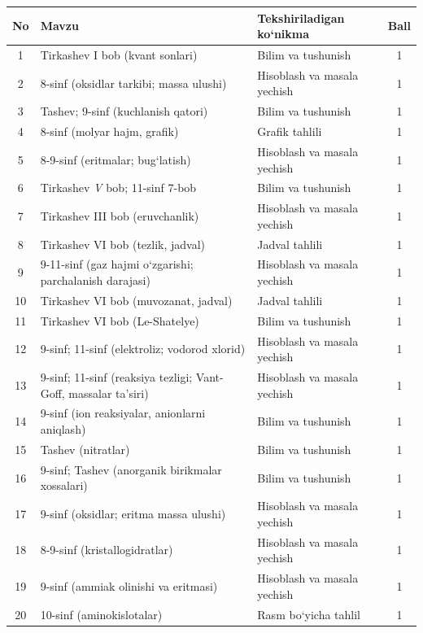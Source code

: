 \documentclass[11pt,a4paper]{article}
\begin{document}
{\small\noindent\begin{longtable}{|c|p{7.2cm}|p{5.4cm}|c|}\hline \textbf{No} & \textbf{Mavzu} & \textbf{Tekshiriladigan ko`nikma} & \textbf{Ball}\\\hline
1 & Tirkashev I bob (kvant sonlari) & Bilim va tushunish & 1\\\hline
2 & 8-sinf (oksidlar tarkibi; massa ulushi) & Hisoblash va masala yechish & 1\\\hline
3 & Tashev; 9-sinf (kuchlanish qatori) & Bilim va tushunish & 1\\\hline
4 & 8-sinf (molyar hajm, grafik) & Grafik tahlili & 1\\\hline
5 & 8-9-sinf (eritmalar; bug`latish) & Hisoblash va masala yechish & 1\\\hline
6 & Tirkashev \textit{V} bob; 11-sinf 7-bob & Bilim va tushunish & 1\\\hline
7 & Tirkashev III bob (eruvchanlik) & Hisoblash va masala yechish & 1\\\hline
8 & Tirkashev VI bob (tezlik, jadval) & Jadval tahlili & 1\\\hline
9 & 9-11-sinf (gaz hajmi o`zgarishi; parchalanish darajasi) & Hisoblash va masala yechish & 1\\\hline
10 & Tirkashev VI bob (muvozanat, jadval) & Jadval tahlili & 1\\\hline
11 & Tirkashev VI bob (Le-Shatelye) & Bilim va tushunish & 1\\\hline
12 & 9-sinf; 11-sinf (elektroliz; vodorod xlorid) & Hisoblash va masala yechish & 1\\\hline
13 & 9-sinf; 11-sinf (reaksiya tezligi; Vant-Goff, massalar ta'siri) & Hisoblash va masala yechish & 1\\\hline
14 & 9-sinf (ion reaksiyalar, anionlarni aniqlash) & Bilim va tushunish & 1\\\hline
15 & Tashev (nitratlar) & Bilim va tushunish & 1\\\hline
16 & 9-sinf; Tashev (anorganik birikmalar xossalari) & Bilim va tushunish & 1\\\hline
17 & 9-sinf (oksidlar; eritma massa ulushi) & Hisoblash va masala yechish & 1\\\hline
18 & 8-9-sinf (kristallogidratlar) & Hisoblash va masala yechish & 1\\\hline
19 & 9-sinf (ammiak olinishi va eritmasi) & Hisoblash va masala yechish & 1\\\hline
20 & 10-sinf (aminokislotalar) & Rasm bo`yicha tahlil & 1\\\hline

\end{longtable}}
\end{document}
